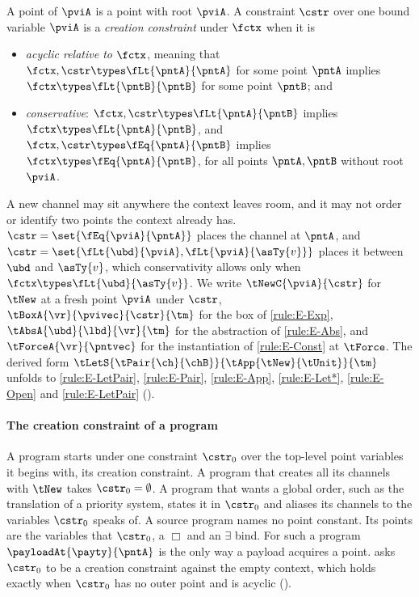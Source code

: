 \begin{definition}
\label{def:creation}
  A point of $\pviA$ is a point with root $\pviA$. A constraint $\cstr$
  over one bound variable $\pviA$ is a \emph{creation constraint} under
  $\fctx$ when it is
  \begin{itemize}
    \item \emph{acyclic relative to $\fctx$}, meaning that
      $\fctx, \cstr \types \fLt{\pntA}{\pntA}$ for some point $\pntA$
      implies $\fctx \types \fLt{\pntB}{\pntB}$ for some point $\pntB$;
      and
    \item \emph{conservative}:
      $\fctx, \cstr \types \fLt{\pntA}{\pntB}$ implies
      $\fctx \types \fLt{\pntA}{\pntB}$, and
      $\fctx, \cstr \types \fEq{\pntA}{\pntB}$ implies
      $\fctx \types \fEq{\pntA}{\pntB}$, for all points
      $\pntA, \pntB$ without root $\pviA$.
  \end{itemize}
\end{definition}

A new channel may sit anywhere the context leaves room, and it may not
order or identify two points the context already has.
$\cstr = \set{\fEq{\pviA}{\pntA}}$ places the channel at $\pntA$, and
$\cstr = \set{\fLt{\ubd}{\pviA}, \fLt{\pviA}{\asTy{v}}}$ places it
between $\ubd$ and $\asTy{v}$, which conservativity allows only when
$\fctx \types \fLt{\ubd}{\asTy{v}}$. We write
$\tNewC{\pviA}{\cstr}$ for $\tNew$ at a fresh point $\pviA$ under
$\cstr$, $\tBoxA{\vr}{\pvivec}{\cstr}{\tm}$ for the box of
\ref{rule:E-Exp}, $\tAbsA{\ubd}{\lbd}{\vr}{\tm}$ for the abstraction of
\ref{rule:E-Abs}, and $\tForceA{\vr}{\pntvec}$ for the instantiation of
\ref{rule:E-Const} at $\tForce$. The derived form
$\tLetS{\tPair{\ch}{\chB}}{\tApp{\tNew}{\tUnit}}{\tm}$ unfolds to
\ref{rule:E-LetPair}, \ref{rule:E-Pair}, \ref{rule:E-App},
\ref{rule:E-Let*}, \ref{rule:E-Open} and \ref{rule:E-LetPair}
().

\paragraph{The creation constraint of a program}
A program starts under one constraint $\cstr_0$ over the top-level point
variables it begins with, its creation constraint. A program that creates
all its channels with $\tNew$ takes $\cstr_0 = \emptyset$. A program that
wants a global order, such as the translation of a priority system,
states it in $\cstr_0$ and aliases its channels to the variables
$\cstr_0$ speaks of. A source program names no point constant. Its points
are the variables that $\cstr_0$, a $\Box$ and an $\exists$ bind. For
such a program $\payloadAt{\payty}{\pntA}$ is the only way a payload
acquires a point.  asks $\cstr_0$ to be a
creation constraint against the empty context, which holds exactly when
$\cstr_0$ has no outer point and is acyclic ().

